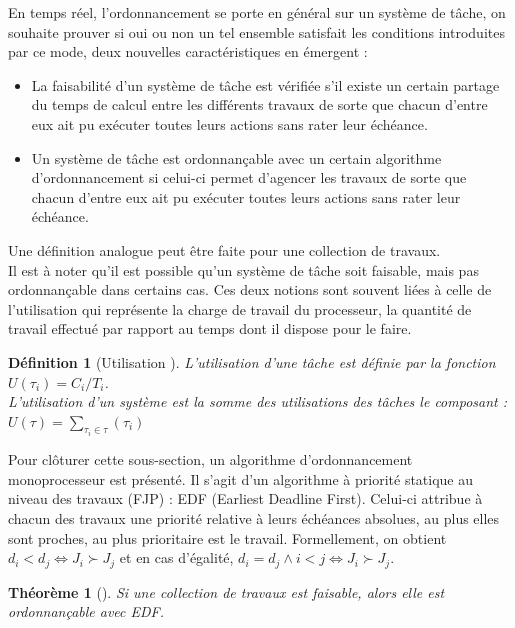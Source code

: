 \documentclass[a4paper]{report}
\theoremstyle{break}
\newtheorem{defin}{Définition}
\theoremstyle{breakplain}
\newtheorem{theo}{Théorème}
\begin{document}
En temps réel, l'ordonnancement se porte en général sur un système de tâche, on souhaite prouver si oui ou non un tel ensemble satisfait les conditions introduites par ce mode, deux nouvelles caractéristiques en émergent \cite{goossens2014os} :

\begin{itemize}
\item La faisabilité d'un système de tâche est vérifiée s'il existe un certain partage du temps de calcul entre les différents travaux de sorte que chacun d'entre eux ait pu exécuter toutes leurs actions sans rater leur échéance.
\item Un système de tâche est ordonnançable avec un certain algorithme d'ordonnancement si celui-ci permet d'agencer les travaux de sorte que chacun d'entre eux ait pu exécuter toutes leurs actions sans rater leur échéance.
\end{itemize}

Une définition analogue peut être faite pour une collection de travaux.\\
Il est à noter qu'il est possible qu'un système de tâche soit faisable, mais pas ordonnançable dans certains cas. Ces deux notions sont souvent liées à celle de l'utilisation qui représente la charge de travail du processeur, la quantité de travail effectué par rapport au temps dont il dispose pour le faire.

\begin{defin}[Utilisation \cite{goossens2014os}]
L'utilisation d'une tâche est définie par la fonction $U(\tau_i) = C_i/T_i$.\\
L'utilisation d'un système est la somme des utilisations des tâches le composant : $U(\tau) = \underset{\tau_i \in \tau}{\sum} (\tau_i)$
\end{defin}

Pour clôturer cette sous-section, un algorithme d'ordonnancement monoprocesseur est présenté. Il s'agit d'un algorithme à priorité statique au niveau des travaux (FJP) : EDF (Earliest Deadline First). Celui-ci attribue à chacun des travaux une priorité relative à leurs échéances absolues, au plus elles sont proches, au plus prioritaire est le travail. Formellement, on obtient $d_i < d_j \Leftrightarrow J_i \succ J_j$ et en cas d'égalité, $d_i = d_j \wedge i < j \Leftrightarrow J_i \succ J_j$.

\begin{theo}[\cite{goossens2014os}]
Si une collection de travaux est faisable, alors elle est ordonnançable avec EDF.
\end{theo}
\end{document}
